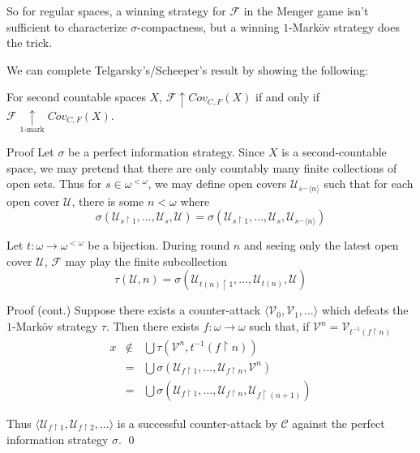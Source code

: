 \documentclass{beamer}
\theoremstyle{definition}
\newcommand{\win}{\uparrow}
\newcommand{\kmarkwin}[1]{\underset{#1\text{-mark}}{\uparrow}}
\newcommand{\mengame}[1]{Cov_{C,F}(#1)}
\newcommand{\concat}{{^\frown}}
\newcommand{\rest}{\restriction}
\newcommand{\<}{\langle}
\renewcommand{\>}{\rangle}
\newcommand{\mc}[1]{\mathcal{#1}}
\newcommand{\pl}[1]{\mathscr{#1}}
\begin{document}
\begin{frame}
  So for regular spaces, a winning strategy for $\pl F$ in the Menger game
  isn't sufficient to characterize $\sigma$-compactness, but a winning
  $1$-Mark\"ov strategy does the trick.

  \vpause

  We can complete Telgarsky's/Scheeper's result by showing the following:

  \begin{theorem}
    For second countable spaces $X$, $\pl F \win \mengame X$ if and only if
    $\pl F \kmarkwin{1}\mengame X$.
  \end{theorem}
\end{frame}

\begin{frame}{Proof}
  Let $\sigma$ be a perfect information strategy.
  Since $X$ is a second-countable space, we may pretend that there are only
  countably many finite collections of open sets. Thus for
  $s\in\omega^{<\omega}$, we may define open covers $\mc U_{s\concat\<n\>}$
  such that for each open cover $\mc U$, there is some $n<\omega$ where
  \[
    \sigma(\mc U_{s\rest 1},\dots,\mc U_{s},\mc U)
      =
    \sigma(\mc U_{s\rest 1},\dots,\mc U_{s},\mc U_{s\concat\<n\>})
  \]

  \vpause

  Let $t:\omega\to\omega^{<\omega}$ be a bijection. During round $n$ and
  seeing only the latest open cover $\mc U$, $\pl F$ may play the finite
  subcollection
  \[
    \tau(\mc U,n) = \sigma(\mc U_{t(n)\rest 1},\dots,\mc U_{t(n)},\mc U)
  \]
\end{frame}

\begin{frame}{Proof (cont.)}
  Suppose there exists a counter-attack $\<\mc V_0,\mc V_1,\dots\>$ which
  defeats the $1$-Mark\"ov strategy $\tau$. Then there exists
  $f:\omega\to\omega$ such that, if $\mc V^n=\mc V_{t^{-1}(f\rest n)}$
  \[
    \begin{array}{rcl}
    x & \not\in & \bigcup \tau(\mc V^n,t^{-1}(f\rest n)) \\
    & = & \bigcup\sigma(\mc U_{f\rest 1},\dots,\mc U_{f\rest n},\mc V^n) \\
    & = & \bigcup\sigma(\mc U_{f\rest 1},\dots,\mc U_{f\rest n},\mc U_{f\rest (n+1)})
    \end{array}
  \]

  \vpause

  Thus $\<\mc U_{f\rest 1}, \mc U_{f\rest 2},\dots\>$ is a successful
  counter-attack by $\pl C$ against the perfect information strategy $\sigma$.
  \qed
\end{frame}
\end{document}
